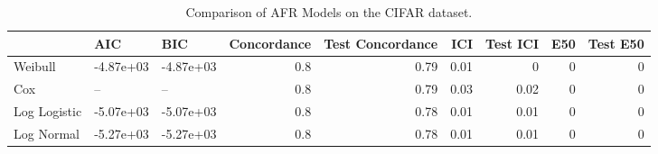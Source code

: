 \begin{table*}
\centering
\caption{Comparison of AFR Models on the CIFAR dataset.}
\label{tab:cifar}
\begin{tabular}{lllrrrrrr}
\toprule
 & AIC & BIC & Concordance & Test Concordance & ICI & Test ICI & E50 & Test E50 \\
\midrule
Weibull & -4.87e+03 & -4.87e+03 & 0.8 & 0.79 & 0.01 & 0 & 0 & 0 \\
Cox & -- & -- & 0.8 & 0.79 & 0.03 & 0.02 & 0 & 0 \\
Log Logistic & -5.07e+03 & -5.07e+03 & 0.8 & 0.78 & 0.01 & 0.01 & 0 & 0 \\
Log Normal & -5.27e+03 & -5.27e+03 & 0.8 & 0.78 & 0.01 & 0.01 & 0 & 0 \\
\bottomrule
\end{tabular}
\end{table*}
